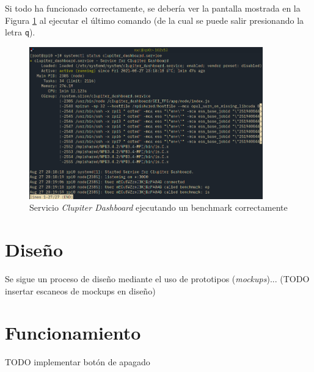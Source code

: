 Si todo ha funcionado correctamente, se debería ver la pantalla mostrada en la Figura \ref{fig:systemd_clupiter_dashboard} al ejecutar el último comando (de la cual se puede salir presionando la letra \texttt{q}).

\begin{figure}[H]
  \centering
  \vspace*{0.5cm}
  \includegraphics[width=0.9\textwidth]{img/systemd_clupiter_dashboard.png}
  \caption{Servicio \textit{Clupiter Dashboard} ejecutando un benchmark correctamente}
  \label{fig:systemd_clupiter_dashboard}
\end{figure}

\section{Diseño}
Se sigue un proceso de diseño mediante el uso de prototipos (\textit{mockups})... (TODO insertar escaneos de mockups en diseño)

\section{Funcionamiento}

TODO implementar botón de apagado
